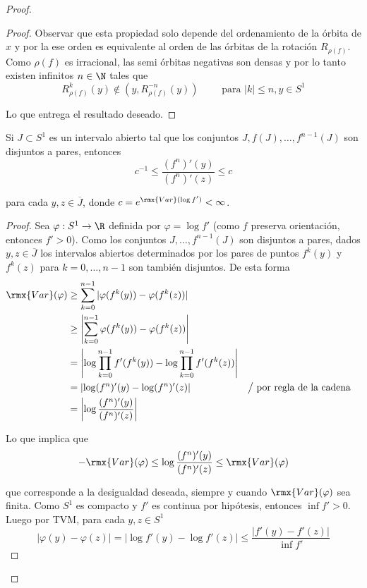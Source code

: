\documentclass[	docname= Sistemas\ Din\'amicos,
				finished=1,
				semester=1,
				year=2017,
				professor=Godofredo\ Iommi,
				sigla=MAT2565]{apunte}
\begin{document}
\begin{proof}
\begin{afirmacion}
\begin{proof}
		Observar que esta propiedad solo depende del ordenamiento de la órbita de $x$ y por la  ese orden es equivalente al orden de las órbitas de la rotación $R_{\rho(f)}$. Como $\rho(f)$ es irracional, las semi órbitas negativas son densas y por lo tanto existen infinitos $n \in \N$ tales que
			$$R_{\rho(f)}^{k}(y) \notin (y,R_{\rho(f)}^{-n}(y)) \qquad \text{ para } |k|\leq n, y \in S^{1}$$
		
		Lo que entrega el resultado deseado.
		\end{proof}
		
		\item Si $J \subset S^{1}$ es un intervalo abierto tal que los conjuntos $J, f(J), \ldots, f^{n-1}(J)$ son disjuntos a pares, entonces
				$$c^{-1} \leq \frac{(f^{n})'(y)}{(f^{n})'(z)} \leq c$$
			
			para cada $y,z \in \overline{J}$, donde $c = e^{ \rmx{Var}(\log f')} < \infty$.
			
		\begin{proof} Sea $\varphi: S^{1} \to \R$ definida por $\varphi = \log f'$ (como $f$ preserva orientación, entonces $f' > 0$). Como los conjuntos $J , \ldots, f^{n-1}(J)$ son disjuntos a pares, dados $y,z \in \overline{J}$ los intervalos abiertos determinados por los pares de puntos $f^{k}(y)$ y $f^{k}(z)$ para $k = 0, \ldots, n-1$ son también disjuntos. De esta forma
			\begin{align*}
				\rmx{Var}(\varphi)
					&\geq	\sum_{k=0}^{n-1} |\varphi(f^{k}(y)) - \varphi(f^{k}(z))|	\\
					&\geq	\left| \sum_{k=0}^{n-1} \varphi(f^{k}(y)) - \varphi(f^{k}(z))\right|	\\
					&=		\left| \log \prod_{k=0}^{n-1} f'(f^{k}(y)) - \log \prod_{k=0}^{n-1} f'(f^{k}(z)) \right|	\\
					&=		\left| \log (f^{n})'(y) - \log (f^{n})'(z) \right|	&&\big/ \text{ por regla de la cadena}	\\
					&=		\left| \log \frac{(f^{n})'(y)}{(f^{n})'(z)} \right|
			\end{align*}
		
		Lo que implica que
			$$-\rmx{Var}(\varphi) \leq \log \frac{(f^{n})'(y)}{(f^{n})'(z)} \leq \rmx{Var}(\varphi)$$
		
		que corresponde a la desigualdad deseada, siempre y cuando $\rmx{Var}(\varphi)$ sea finita. Como $S^{1}$ es compacto y $f'$ es continua por hipótesis, entonces $\inf f' > 0$. Luego por TVM, para cada $y,z \in S^{1}$
			$$|\varphi(y) - \varphi(z)| = |\log f'(y) - \log f'(z)| \leq \frac{|f'(y) - f'(z)|}{\inf f'}$$
		

\end{proof}
\end{afirmacion}
\end{proof}
\end{document}
